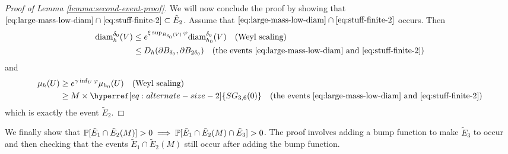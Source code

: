 \documentclass[12pt]{amsart}
\numberwithin{equation}{section}
\newcommand{\SGrho}[2]{\hyperref[eq:alternate-size-2]{SG_{#1}(#2)}}
\begin{document}
\begin{proof}[Proof of Lemma \ref{lemma:second-event-proof}]
		We will now conclude the proof by showing that $\eqref{eq:large-mass-low-diam} \cap \eqref{eq:stuff-finite-2} \subset \tilde E_2$. 
		Assume that $\eqref{eq:large-mass-low-diam} \cap \eqref{eq:stuff-finite-2}$ occurs. Then
		\begin{align*}
		\diam^{\delta_0}_h(V) &\leq   e^{\xi \sup_{B_{\delta_0}(V)} \varphi}  \diam^{\delta_0}_{h_0}(V) \quad \mbox{(Weyl scaling)} \\
		&\leq D_h(\partial B_{\delta_0}, \partial B_{2 \delta_0}) \quad \mbox{(the events \eqref{eq:large-mass-low-diam} and \eqref{eq:stuff-finite-2})}
		\end{align*}
		and
		\begin{align*}
		\mu_h(U)&\geq  e^{\gamma \inf_{U} \varphi}  \mu_{h_0}(U) \quad \mbox{(Weyl scaling)} \\
		&\geq M \times \SGrho{3,6}{0} \quad \mbox{(the events \eqref{eq:large-mass-low-diam} and \eqref{eq:stuff-finite-2})}
		\end{align*}
		which is exactly the event $\tilde E_2$. 
	\end{proof}
	
	We finally show that $\P[\tilde E_1 \cap \tilde E_2(M) ] > 0 \implies \P[\tilde E_1 \cap \tilde E_2(M) \cap \tilde E_3] > 0$. 
	The proof involves adding a bump function to make $\tilde E_3$ to occur and then checking that the events
	$\tilde E_1 \cap \tilde E_2(M)$ still occur after adding the bump function.
	
\end{document}
